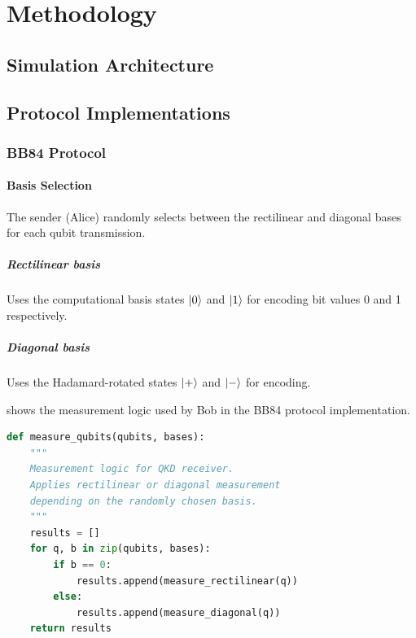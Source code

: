 \documentclass[10pt, a4paper]{report}
\begin{document}
\chapter{Methodology}

\section{Simulation Architecture}


\section{Protocol Implementations}


\subsection{BB84 Protocol}

\subsubsection{Basis Selection} The sender (Alice) randomly selects
between the rectilinear and diagonal bases for each qubit transmission.

\paragraph{Rectilinear basis} Uses the computational basis states
$\ket{0}$ and $\ket{1}$ for encoding bit values 0 and 1 respectively.

\paragraph{Diagonal basis} Uses the Hadamard-rotated states
$\ket{+}$ and $\ket{-}$ for encoding.

 shows the measurement logic used by Bob
in the BB84 protocol implementation.

\begin{lstlisting}[language=Python, caption={BB84 Bob's measurement logic}, label={lst:measure}]
def measure_qubits(qubits, bases):
    """
    Measurement logic for QKD receiver.
    Applies rectilinear or diagonal measurement
    depending on the randomly chosen basis.
    """
    results = []
    for q, b in zip(qubits, bases):
        if b == 0:
            results.append(measure_rectilinear(q))
        else:
            results.append(measure_diagonal(q))
    return results
\end{lstlisting}
\end{document}

